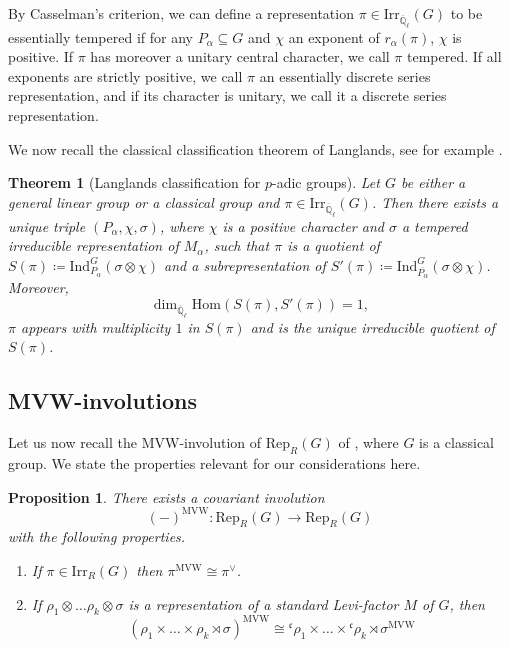 \documentclass[10pt,a4paper]{article}
\newtheorem{theorem}{Theorem}
\newtheorem{prop}{Proposition}
\theoremstyle{remark}
\theoremstyle{definition}
\newcommand{\ql}{{\overline{\mathbb{Q}}_\ell}}
\newcommand{\rep}{\mathrm{Rep}}
\newcommand{\ho}{\mathrm{Hom}}
\newcommand{\id}{\mathrm{Ind}}
\newcommand{\ra}{\rightarrow}
\newcommand{\irr}{\mathrm{Irr}}
\newcommand{\mvw}{^\mathrm{MVW}}
\newcommand{\fc}{\mathfrak{c}}
\begin{document}
By Casselman's criterion, we can define a representation $\pi\in\irr_\ql(G)$ to be essentially tempered if for any $P_\alpha\subseteq G$ and $\chi$ an exponent of $r_\alpha(\pi)$, $\chi$ is positive. If $\pi$ has moreover a unitary central character, we call $\pi$ tempered.
If all exponents are strictly positive, we call $\pi$ an essentially discrete series representation, and if its character is unitary, we call it a discrete series representation.

We now recall the classical classification theorem of Langlands, see for example \cite{Borel_Wallach_2000}.
\begin{theorem}[Langlands classification for $p$-adic groups]
    Let $G$ be either a general linear group or a classical group and $\pi\in\irr_\ql(G)$. Then there exists a unique triple $(P_\alpha,\chi,\sigma)$, where $\chi$ is a positive character and $\sigma$ a tempered irreducible representation of $M_\alpha$, such that $\pi$ is a quotient of $S(\pi)\coloneqq\id_{P_\alpha}^G(\sigma\otimes\chi)$ and a subrepresentation of $S'(\pi)\coloneqq \id_{\overline{P_\alpha}}^G(\sigma\otimes\chi)$. Moreover,
    \[\dim_\ql\ho(S(\pi),S'(\pi))=1,\]
    $\pi$ appears with multiplicity $1$ in $S(\pi)$ and is the unique irreducible quotient of $S(\pi)$.
\end{theorem}
\subsection{MVW-involutions}
Let us now recall the MVW-involution of $\rep_R(G)$ of \cite{Waldspurger_1987}, where $G$ is a classical group. We state the properties relevant for our considerations here.
\begin{prop}\label{P:MVW}
    There exists a covariant involution 
    \[(-)\mvw\colon \rep_R(G)\ra \rep_R(G)\] with the following properties.
    \begin{enumerate}
        \item If $\pi\in\irr_R(G)$ then $\pi\mvw\cong\pi^\lor$.
        \item If $\rho_1\otimes\ldots\rho_k\otimes \sigma$ is a representation of a standard Levi-factor $M$ of $G$, then 
        \[(\rho_1\times\ldots\times \rho_k\rtimes\sigma)\mvw\cong {}^\fc\rho_1\times\ldots\times{}^\fc\rho_k\rtimes \sigma\mvw\]
    \end{enumerate}
\end{prop}
\end{document}
